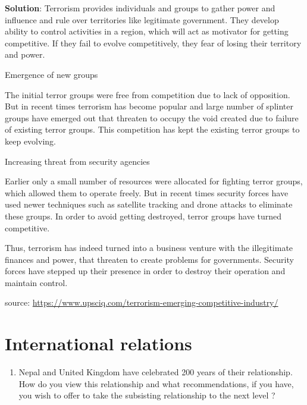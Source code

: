 \documentclass[
  openany]{book}
\providecommand{\tightlist}{%
  \setlength{\itemsep}{0pt}\setlength{\parskip}{0pt}}
\newenvironment{solution}{ {\bfseries Solution}:}{}
\begin{document}
\begin{questions}
\begin{solution}
Terrorism provides individuals and groups to gather power and influence and rule over territories like legitimate government. They develop ability to control activities in a region, which will act as motivator for getting competitive. If they fail to evolve competitively, they fear of losing their territory and power.

Emergence of new groups

The initial terror groups were free from competition due to lack of opposition. But in recent times terrorism has become popular and large number of splinter groups have emerged out that threaten to occupy the void created due to failure of existing terror groups. This competition has kept the existing terror groups to keep evolving.

Increasing threat from security agencies

Earlier only a small number of resources were allocated for fighting terror groups, which allowed them to operate freely. But in recent times security forces have used newer techniques such as satellite tracking and drone attacks to eliminate these groups. In order to avoid getting destroyed, terror groups have turned competitive.

Thus, terrorism has indeed turned into a business venture with the illegitimate finances and power, that threaten to create problems for governments. Security forces have stepped up their presence in order to destroy their operation and maintain control.

source: \url{https://www.upsciq.com/terrorism-emerging-competitive-industry/}
\end{solution}
\end{questions}

\hypertarget{international-relations}{%
\section{International relations}\label{international-relations}}

\begin{enumerate}
\def\labelenumi{\arabic{enumi}.}
\tightlist
\item
  Nepal and United Kingdom have celebrated 200 years of their relationship. How do you view this relationship and what recommendations, if you have, you wish to offer to take the subsisting relationship to the next level ?
\end{enumerate}
\end{document}
